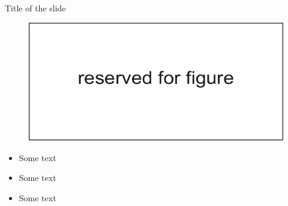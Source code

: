 \documentclass[russian,12pt,aspectratio=169,xcolor=table]{beamer}
\begin{document}
\begin{frame}{Title of the slide}
\qquad	\begin{minipage}{.42\textwidth}
	\begin{figure}
		\centering
		\includegraphics[scale=0.6]{img/3}
	\end{figure}
	\end{minipage} \hfill
\begin{minipage}{.45\textwidth}
\begin{itemize}
	\item Some text
	\item	Some text
	\item	Some text
	\end{itemize}
\end{minipage}
\end{frame}
\end{document}
